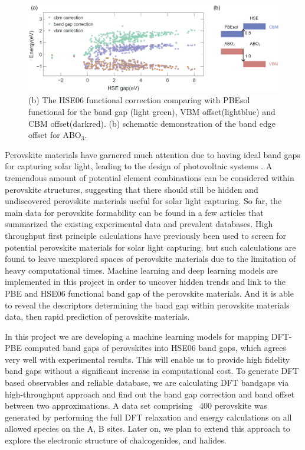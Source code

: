 \documentclass[twocolumn,
superscriptaddress,
 amsmath,amssymb,
 aps, citeautoscript,
prb,
]{revtex4-1}
\begin{document}


\begin{figure}[ht]
\begin{center}
\includegraphics[width=6.0in]{Figures/fig2_v1.eps}
\end{center}
\caption{ (b) The HSE06 functional correction comparing with PBEsol functional for the band gap (light green), VBM offset(lightblue) and CBM offset(darkred). (b) schematic demonstration of the band edge offset for ABO$_{3}$. 
}
\label{fig2}
\end{figure}

Perovskite materials have garnered much attention due to having ideal band gaps for capturing solar light, leading to the design of photovoltaic systems \cite{Pilania2013,Lee2012}. A tremendous amount of potential element combinations can be considered within perovskite structures, suggesting that there should still be hidden and undiscovered perovskite materials useful for solar light capturing. So far, the main data for perovskite formability can be found in a few articles that summarized the existing experimental data and prevalent databases. High throughput first principle calculations have previously been used to screen for potential perovskite materials for solar light capturing\cite{Huo2018, Sun2015}, but such calculations are found to leave unexplored spaces of perovskite materials due to the limitation of heavy computational times. Machine learning and deep learning models are implemented in this project in order to uncover hidden trends and link to the PBE and HSE06 functional band gap of the perovskite materials. And it is able to reveal the descriptors determining the band gap within perovskite materials data, then rapid prediction of perovskite materials. 

In this project we are developing a machine learning models for mapping DFT-PBE computed band gaps of perovskites into HSE06 band gaps, which agrees very well with experimental results.  This will enable us to provide high fidelity band gaps without a significant increase in computational cost.  To generate DFT based observables and reliable database, we are calculating DFT bandgaps via high-throughput approach and find out the band gap correction and band offset between two approximations. A data set comprising ~400 perovskite was generated by performing the full DFT relaxation and energy calculations on all allowed species on the A, B sites. Later on, we plan to extend this approach to explore the electronic structure of chalcogenides, and halides. 
\end{document}
